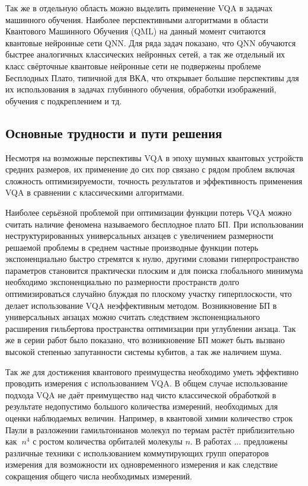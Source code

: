 \documentclass[12pt]{extarticle}
\begin{document}
\qquad Так же в отдельную область можно выделить применение VQA в задачах машинного обучения. Наиболее перспективными алгоритмами в области Квантового Машинного Обучения (QML) на данный момент считаются квантовые нейронные сети QNN. Для ряда задач показано, что QNN обучаются быстрее аналогичных классических нейронных сетей, а так же отдельный их класс свёрточные квантовые нейронные сети не подвержены проблеме Бесплодных Плато, типичной для ВКА, что открывает большие перспективы для их использования в задачах глубинного обучения, обработки изображений, обучения с подкреплением и тд.

\subsection{Основные трудности и пути решения}

\qquad Несмотря на возможные перспективы VQA в эпоху шумных квантовых устройств средних размеров, их применение до сих пор связано с рядом проблем включая сложность оптимизируемости, точность результатов и эффективность применения VQA в сравнении с классическими алгоритмами.

\qquad Наиболее серьёзной проблемой при оптимизации функции потерь  VQA можно считать наличие феномена называемого бесплодное плато БП. При использовании неструктурированных универсальных анзацев с увеличением размерности решаемой проблемы в среднем частные производные функции потерь экспоненциально быстро стремятся к нулю, другими словами гиперпространство параметров становится практически плоским и для поиска глобального минимума необходимо экспоненциально по размерности пространств долго оптимизироваться случайно блуждая по плоскому участку гиперплоскости, что делает использование VQA неэффективным методом. Возникновение БП в универсальных анзацах можно считать следствием экспоненциального расширения гильбертова пространства оптимизации при углублении анзаца. Так же в серии работ было показано, что возникновение БП может быть вызвано высокой степенью запутанности системы кубитов, а так же наличием шума.

\qquad Так же для достижения квантового преимущества необходимо уметь эффективно проводить измерения с использованием VQA. В общем случае использование подхода VQA не даёт преимущество над чисто классической обработкой в результате недопустимо большого количества измерений, необходимых для оценки наблюдаемых величин. Например, в квантовой химии количество строк Паули в разложении гамильтонианов молекул по термам растёт приблизительно как $~n^{4}$ с ростом количества орбиталей молекулы $n$. В работах ... предложены различные техники с использованием коммутирующих групп операторов измерения для возможности их одновременного измерения и как следствие сокращения общего числа необходимых измерений. 
\end{document}
